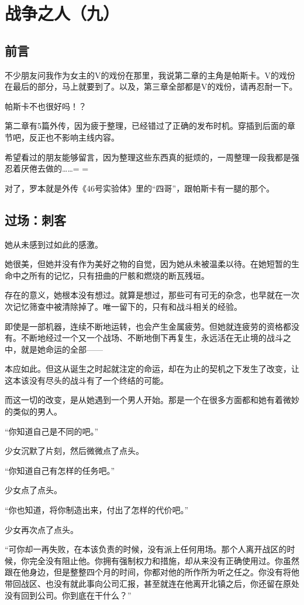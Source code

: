 \chapter{战争之人（九）}
\section*{前言}
不少朋友问我作为女主的V的戏份在那里，我说第二章的主角是帕斯卡。V的戏份在最后的部分，马上就要到了。以及，第三章全部都是V的戏份，请再忍耐一下。

帕斯卡不也很好吗！？

第二章有5篇外传，因为疲于整理，已经错过了正确的发布时机。穿插到后面的章节吧，反正也不影响主线内容。

希望看过的朋友能够留言，因为整理这些东西真的挺烦的，一周整理一段我都是强忍着厌倦去做的……= =

对了，罗本就是外传《46号实验体》里的“四哥”，跟帕斯卡有一腿的那个。

\lineseparator
\section*{过场：刺客}

她从未感到过如此的感激。

她很美，但她并没有作为美好之物的自觉，因为她从未被温柔以待。在她短暂的生命中之所有的记忆，只有扭曲的尸骸和燃烧的断瓦残垣。

存在的意义，她根本没有想过。就算是想过，那些可有可无的杂念，也早就在一次次记忆筛查中被清除掉了。唯一留下的，只有和战斗相关的经验。

即使是一部机器，连续不断地运转，也会产生金属疲劳。但她就连疲劳的资格都没有。不断地经过一个又一个战场、不断地倒下再复生，永远活在无止境的战斗之中，就是她命运的全部——

本应如此。但这从诞生之时起就注定的命运，却在为止的契机之下发生了改变，让这本该没有尽头的战斗有了一个终结的可能。

而这一切的改变，是从她遇到一个男人开始。那是一个在很多方面都和她有着微妙的类似的男人。

\lineseparator

“你知道自己是不同的吧。”

少女沉默了片刻，然后微微点了点头。

“你知道自己有怎样的任务吧。”

少女点了点头。

“你也知道，将你制造出来，付出了怎样的代价吧。”

少女再次点了点头。

“可你却一再失败，在本该负责的时候，没有派上任何用场。那个人离开战区的时候，你完全没有阻止他。你拥有强制权力和措施，却从来没有正确使用过。你虽然跟在他身边，但是整整四个月的时间，你都对他的所作所为听之任之。你没有将他带回战区、也没有就此事向公司汇报，甚至就连在他离开北镇之后，你还留在原处没有回到公司。你到底在干什么？”

